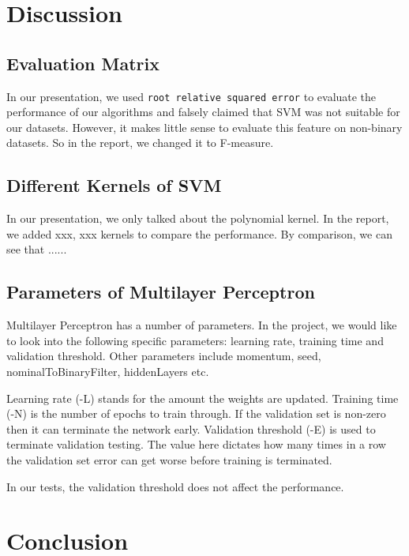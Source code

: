 \documentclass[11pt]{article}
\begin{document}
\section{Discussion}

\subsection{Evaluation Matrix}
In our presentation, we used \texttt{root relative squared error} to evaluate the performance of our algorithms and falsely claimed that SVM was not suitable for our datasets. However, it makes little sense to evaluate this feature on  non-binary datasets. So in the report, we changed it to F-measure.

\subsection{Different Kernels of SVM}
In our presentation, we only talked about the polynomial kernel. In the report, we added xxx, xxx kernels to compare the performance. By comparison, we can see that ......

\subsection{Parameters of Multilayer Perceptron}
Multilayer Perceptron has a number of parameters. In the project, we would like to look into the following specific parameters: learning rate, training time and validation threshold. Other parameters include momentum, seed, nominalToBinaryFilter, hiddenLayers etc.

Learning rate (-L) stands for the amount the weights are updated. Training time (-N) is the number of epochs to train through. If the validation set is non-zero then it can terminate the network early. Validation threshold (-E) is used to terminate validation testing. The value here dictates how many times in a row the validation set error can get worse before training is terminated.

In our tests, the validation threshold does not affect the performance.
 
\section{Conclusion}



\newpage


\end{document}
